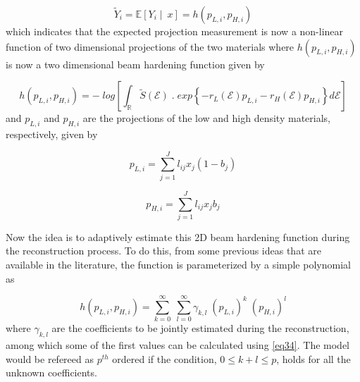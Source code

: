 \begin{equation}
\label{eq30}
\widetilde{Y}_{i} = \mathbb{E} \left[ Y_i\mid\ x \right] =  h \left( p_{L,i} , p_{H,i} \right)
\end{equation} which indicates that the expected projection measurement is now a non-linear function of two dimensional projections of the two materials where $h \left( p_{L,i} , p_{H,i} \right)$ is now a two dimensional beam hardening function given by

\begin{equation}
\label{eq31}
h \left( p_{L,i} , p_{H,i} \right) = - \; log \left[ \int_{\mathbb{R}} \widetilde{S}(\mathcal{E}) \; . \; exp \left\lbrace - r_L(\mathcal{E}) p_{L,i} - r_H(\mathcal{E}) p_{H,i} \right\rbrace d\mathcal{E}  \right]
\end{equation} and $p_{L,i}$ and $p_{H,i}$ are the projections of the low and high density materials, respectively, given by

\begin{equation}
\label{eq32}
p_{L,i} = \sum\limits_{j=1}^J l_{ij} x_j (1-b_j)
\end{equation} 

\begin{equation}
\label{eq33}
p_{H,i} = \sum\limits_{j=1}^J l_{ij} x_j b_j  
\end{equation}

Now the idea is to adaptively estimate this 2D beam hardening function during the reconstruction process. To do this, from some previous ideas that are available in the literature, the function is parameterized by a simple polynomial as

\begin{equation}
\label{eq34}
h \left( p_{L,i} , p_{H,i} \right) = \sum\limits_{k=0}^\infty \; \sum\limits_{l=0}^\infty \gamma_{k,l} \; \left(p_{L,i}\right)^{k} \; \left(p_{H,i}\right)^{l}
\end{equation} where $\gamma_{k,l}$ are the coefficients to be jointly estimated during the reconstruction, among which some of the first values can be calculated using \ref{eq34}. The model would be refereed as $p^{th}$ ordered if the condition, $0 \leq k+l \leq p$, holds for all the unknown coefficients.


% 

